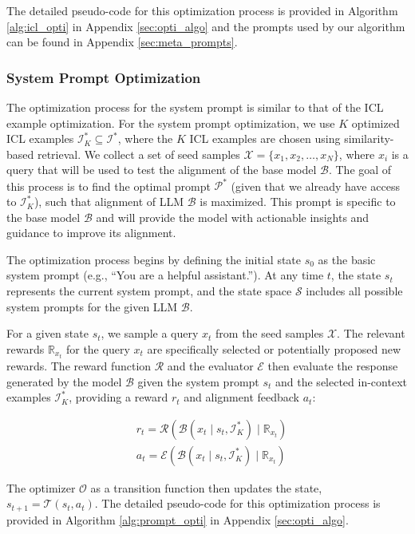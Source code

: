 The detailed pseudo-code for this optimization process is provided in Algorithm \ref{alg:icl_opti} in Appendix \ref{sec:opti_algo} and the prompts used by our algorithm can be found in Appendix \ref{sec:meta_prompts}.



\subsubsection{System Prompt Optimization}

The optimization process for the system prompt is similar to that of the ICL example optimization. For the system prompt optimization, we use $K$ optimized ICL examples $\mathcal{I}_K^*  \subseteq \mathcal{I}^*$, where the $K$ ICL examples are chosen using similarity-based retrieval. We collect a set of seed samples $\mathcal{X} = \{x_1, x_2, \ldots, x_N \}$, where $x_i$ is a query that will be used to test the alignment of the base model $\mathcal{B}$. The goal of this process is to find the optimal prompt $\mathcal{P}^*$ (given that we already have access to $\mathcal{I}_K^*$), such that alignment of LLM $\mathcal{B}$ is maximized. This prompt is specific to the base model $\mathcal{B}$ and will provide the model with actionable insights and guidance to improve its alignment.


The optimization process begins by defining the initial state $s_0$ as the basic system prompt (e.g., ``You are a helpful assistant.''). At any time $t$, the state $s_t$ represents the current system prompt, and the state space $\mathcal{S}$ includes all possible system prompts for the given LLM $\mathcal{B}$.


For a given state $s_t$, we sample a query $x_t$ from the seed samples $\mathcal{X}$. The relevant rewards $\mathbb{R}_{x_t}$ for the query $x_t$ are specifically selected or potentially proposed new rewards. The reward function $\mathcal{R}$ and the evaluator $\mathcal{E}$ then evaluate the response generated by the model $\mathcal{B}$ given the system prompt $s_t$ and the selected in-context examples $\mathcal{I}_K^*$, providing a reward $r_t$ and alignment feedback $a_t$:

\[
\begin{aligned}
& r_t = \mathcal{R}(\mathcal{B}(x_t \mid s_t, \mathcal{I}_K^*)\mid \mathbb{R}_{x_t}) \\
& a_t = \mathcal{E}(\mathcal{B}(x_t \mid s_t, \mathcal{I}_K^*)\mid \mathbb{R}_{x_t})
\end{aligned}
\]

The optimizer $\mathcal{O}$ as a transition function then updates the state, $ s_{t+1} = \mathcal{T}(s_t, a_t) $. The detailed pseudo-code for this optimization process is provided in Algorithm \ref{alg:prompt_opti} in Appendix \ref{sec:opti_algo}.